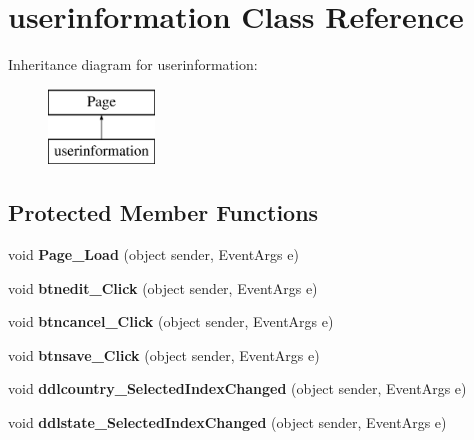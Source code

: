 \hypertarget{classuserinformation}{\section{userinformation Class Reference}
\label{classuserinformation}
}
Inheritance diagram for userinformation\-:\begin{figure}[H]
\begin{center}
\leavevmode
\includegraphics[height=2.000000cm]{classuserinformation}
\end{center}
\end{figure}
\subsection*{Protected Member Functions}
\begin{DoxyCompactItemize}
\item 
\hypertarget{classuserinformation_af734bdeedf61434bf29d9b46e726441f}{void {\bfseries Page\-\_\-\-Load} (object sender, Event\-Args e)}\label{classuserinformation_af734bdeedf61434bf29d9b46e726441f}

\item 
\hypertarget{classuserinformation_abefd1ef81db769790bb7f640904e5fe0}{void {\bfseries btnedit\-\_\-\-Click} (object sender, Event\-Args e)}\label{classuserinformation_abefd1ef81db769790bb7f640904e5fe0}

\item 
\hypertarget{classuserinformation_aa72cef6398fd3329922eae4d52b0dbc4}{void {\bfseries btncancel\-\_\-\-Click} (object sender, Event\-Args e)}\label{classuserinformation_aa72cef6398fd3329922eae4d52b0dbc4}

\item 
\hypertarget{classuserinformation_a160472f63ab0e477801d7487b17bc8c3}{void {\bfseries btnsave\-\_\-\-Click} (object sender, Event\-Args e)}\label{classuserinformation_a160472f63ab0e477801d7487b17bc8c3}

\item 
\hypertarget{classuserinformation_a0a7378ba5f44aa56cf0d8e39fcbe3148}{void {\bfseries ddlcountry\-\_\-\-Selected\-Index\-Changed} (object sender, Event\-Args e)}\label{classuserinformation_a0a7378ba5f44aa56cf0d8e39fcbe3148}

\item 
\hypertarget{classuserinformation_aeac9885957c5edd5640438e5cacd7987}{void {\bfseries ddlstate\-\_\-\-Selected\-Index\-Changed} (object sender, Event\-Args e)}\label{classuserinformation_aeac9885957c5edd5640438e5cacd7987}

\end{DoxyCompactItemize}


